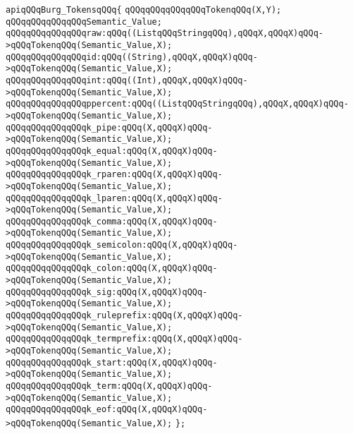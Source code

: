 \label{src/app/burg/burg.grammar.api}
\verb|apiqQQqBurg_TokensqQQq{|\newline
\verb|qQQqqQQqqQQqqQQqTokenqQQq(X,Y);|\newline
\verb|qQQqqQQqqQQqqQQqSemantic_Value;|\newline
\verb|qQQqqQQqqQQqqQQqraw:qQQq((ListqQQqStringqQQq),qQQqX,qQQqX)qQQq->qQQqTokenqQQq(Semantic_Value,X);|\newline
\verb|qQQqqQQqqQQqqQQqid:qQQq((String),qQQqX,qQQqX)qQQq->qQQqTokenqQQq(Semantic_Value,X);|\newline
\verb|qQQqqQQqqQQqqQQqint:qQQq((Int),qQQqX,qQQqX)qQQq->qQQqTokenqQQq(Semantic_Value,X);|\newline
\verb|qQQqqQQqqQQqqQQqppercent:qQQq((ListqQQqStringqQQq),qQQqX,qQQqX)qQQq->qQQqTokenqQQq(Semantic_Value,X);|\newline
\verb|qQQqqQQqqQQqqQQqk_pipe:qQQq(X,qQQqX)qQQq->qQQqTokenqQQq(Semantic_Value,X);|\newline
\verb|qQQqqQQqqQQqqQQqk_equal:qQQq(X,qQQqX)qQQq->qQQqTokenqQQq(Semantic_Value,X);|\newline
\verb|qQQqqQQqqQQqqQQqk_rparen:qQQq(X,qQQqX)qQQq->qQQqTokenqQQq(Semantic_Value,X);|\newline
\verb|qQQqqQQqqQQqqQQqk_lparen:qQQq(X,qQQqX)qQQq->qQQqTokenqQQq(Semantic_Value,X);|\newline
\verb|qQQqqQQqqQQqqQQqk_comma:qQQq(X,qQQqX)qQQq->qQQqTokenqQQq(Semantic_Value,X);|\newline
\verb|qQQqqQQqqQQqqQQqk_semicolon:qQQq(X,qQQqX)qQQq->qQQqTokenqQQq(Semantic_Value,X);|\newline
\verb|qQQqqQQqqQQqqQQqk_colon:qQQq(X,qQQqX)qQQq->qQQqTokenqQQq(Semantic_Value,X);|\newline
\verb|qQQqqQQqqQQqqQQqk_sig:qQQq(X,qQQqX)qQQq->qQQqTokenqQQq(Semantic_Value,X);|\newline
\verb|qQQqqQQqqQQqqQQqk_ruleprefix:qQQq(X,qQQqX)qQQq->qQQqTokenqQQq(Semantic_Value,X);|\newline
\verb|qQQqqQQqqQQqqQQqk_termprefix:qQQq(X,qQQqX)qQQq->qQQqTokenqQQq(Semantic_Value,X);|\newline
\verb|qQQqqQQqqQQqqQQqk_start:qQQq(X,qQQqX)qQQq->qQQqTokenqQQq(Semantic_Value,X);|\newline
\verb|qQQqqQQqqQQqqQQqk_term:qQQq(X,qQQqX)qQQq->qQQqTokenqQQq(Semantic_Value,X);|\newline
\verb|qQQqqQQqqQQqqQQqk_eof:qQQq(X,qQQqX)qQQq->qQQqTokenqQQq(Semantic_Value,X);|\newline
\verb|};|\newline
